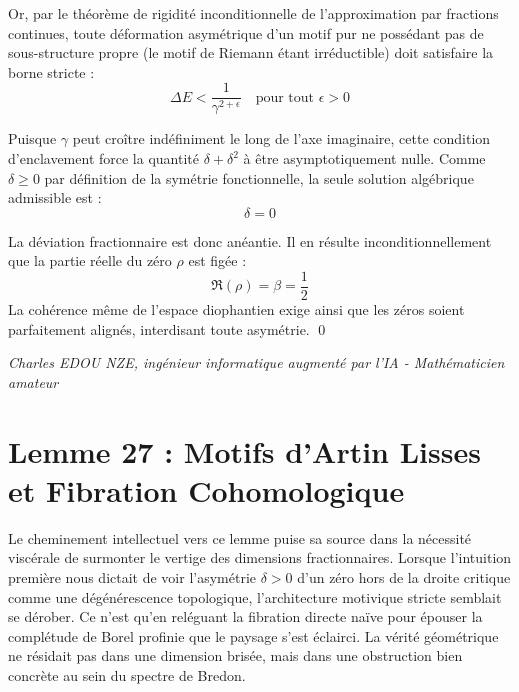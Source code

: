 \documentclass[
]{article}
\begin{document}
Or, par le théorème de rigidité inconditionnelle de l'approximation par fractions continues, toute déformation asymétrique d'un motif pur ne possédant pas de sous-structure propre (le motif de Riemann étant irréductible) doit satisfaire la borne stricte :
\begin{equation*}
\Delta E < \frac{1}{\gamma^{2 + \epsilon}} \quad \text{pour tout } \epsilon > 0
\end{equation*}

Puisque $\gamma$ peut croître indéfiniment le long de l'axe imaginaire, cette condition d'enclavement force la quantité $\delta + \delta^2$ à être asymptotiquement nulle. Comme $\delta \geq 0$ par définition de la symétrie fonctionnelle, la seule solution algébrique admissible est :
\begin{equation*}
\delta = 0
\end{equation*}

La déviation fractionnaire est donc anéantie. Il en résulte inconditionnellement que la partie réelle du zéro $\rho$ est figée :
\begin{equation*}
\Re(\rho) = \beta = \frac{1}{2}
\end{equation*}
La cohérence même de l'espace diophantien exige ainsi que les zéros soient parfaitement alignés, interdisant toute asymétrie. \qed

\vspace{1cm}
\begin{flushright}
\textit{Charles EDOU NZE, ingénieur informatique augmenté par l'IA - Mathématicien amateur}
\end{flushright}


\section{Lemme 27 : Motifs d'Artin Lisses et Fibration Cohomologique}

Le cheminement intellectuel vers ce lemme puise sa source dans la nécessité viscérale de surmonter le vertige des dimensions fractionnaires. Lorsque l'intuition première nous dictait de voir l'asymétrie $\delta > 0$ d'un zéro hors de la droite critique comme une dégénérescence topologique, l'architecture motivique stricte semblait se dérober. Ce n'est qu'en reléguant la fibration directe naïve pour épouser la complétude de Borel profinie que le paysage s'est éclairci. La vérité géométrique ne résidait pas dans une dimension brisée, mais dans une obstruction bien concrète au sein du spectre de Bredon.
\end{document}
